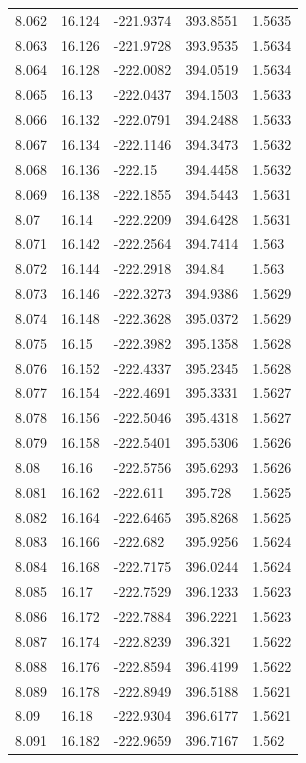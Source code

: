 \begin{tabular}{lllll}
8.062 & 16.124 & -221.9374 & 393.8551 & 1.5635 \\
8.063 & 16.126 & -221.9728 & 393.9535 & 1.5634 \\
8.064 & 16.128 & -222.0082 & 394.0519 & 1.5634 \\
8.065 & 16.13 & -222.0437 & 394.1503 & 1.5633 \\
8.066 & 16.132 & -222.0791 & 394.2488 & 1.5633 \\
8.067 & 16.134 & -222.1146 & 394.3473 & 1.5632 \\
8.068 & 16.136 & -222.15 & 394.4458 & 1.5632 \\
8.069 & 16.138 & -222.1855 & 394.5443 & 1.5631 \\
8.07 & 16.14 & -222.2209 & 394.6428 & 1.5631 \\
8.071 & 16.142 & -222.2564 & 394.7414 & 1.563 \\
8.072 & 16.144 & -222.2918 & 394.84 & 1.563 \\
8.073 & 16.146 & -222.3273 & 394.9386 & 1.5629 \\
8.074 & 16.148 & -222.3628 & 395.0372 & 1.5629 \\
8.075 & 16.15 & -222.3982 & 395.1358 & 1.5628 \\
8.076 & 16.152 & -222.4337 & 395.2345 & 1.5628 \\
8.077 & 16.154 & -222.4691 & 395.3331 & 1.5627 \\
8.078 & 16.156 & -222.5046 & 395.4318 & 1.5627 \\
8.079 & 16.158 & -222.5401 & 395.5306 & 1.5626 \\
8.08 & 16.16 & -222.5756 & 395.6293 & 1.5626 \\
8.081 & 16.162 & -222.611 & 395.728 & 1.5625 \\
8.082 & 16.164 & -222.6465 & 395.8268 & 1.5625 \\
8.083 & 16.166 & -222.682 & 395.9256 & 1.5624 \\
8.084 & 16.168 & -222.7175 & 396.0244 & 1.5624 \\
8.085 & 16.17 & -222.7529 & 396.1233 & 1.5623 \\
8.086 & 16.172 & -222.7884 & 396.2221 & 1.5623 \\
8.087 & 16.174 & -222.8239 & 396.321 & 1.5622 \\
8.088 & 16.176 & -222.8594 & 396.4199 & 1.5622 \\
8.089 & 16.178 & -222.8949 & 396.5188 & 1.5621 \\
8.09 & 16.18 & -222.9304 & 396.6177 & 1.5621 \\
8.091 & 16.182 & -222.9659 & 396.7167 & 1.562 \\

\end{tabular}
